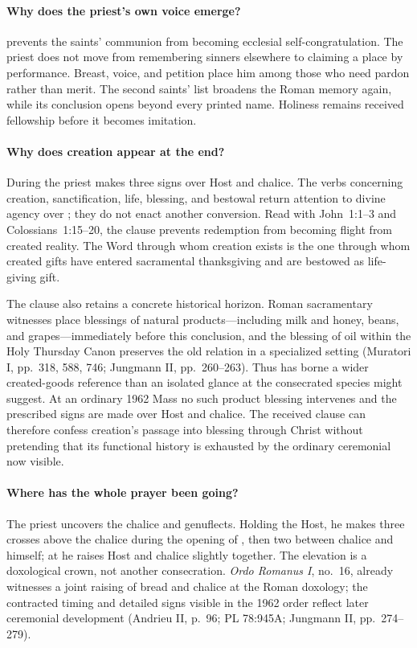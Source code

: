 \paragraph{Why does the priest's own voice emerge?}
 prevents the saints' communion from becoming ecclesial self-congratulation. The priest does not move from remembering sinners elsewhere to claiming a place by performance. Breast, voice, and petition place him among those who need pardon rather than merit. The second saints' list broadens the Roman memory again, while its conclusion opens beyond every printed name. Holiness remains received fellowship before it becomes imitation.

\paragraph{Why does creation appear at the end?}
During  the priest makes three signs over Host and chalice. The verbs concerning creation, sanctification, life, blessing, and bestowal return attention to divine agency over ; they do not enact another conversion. Read with John~1:1--3 and Colossians~1:15--20, the clause prevents redemption from becoming flight from created reality. The Word through whom creation exists is the one through whom created gifts have entered sacramental thanksgiving and are bestowed as life-giving gift.

The clause also retains a concrete historical horizon. Roman sacramentary witnesses place blessings of natural products---including milk and honey, beans, and grapes---immediately before this conclusion, and the blessing of oil within the Holy Thursday Canon preserves the old relation in a specialized setting (Muratori I, pp.~318, 588, 746; Jungmann II, pp.~260--263). Thus  has borne a wider created-goods reference than an isolated glance at the consecrated species might suggest. At an ordinary 1962 Mass no such product blessing intervenes and the prescribed signs are made over Host and chalice. The received clause can therefore confess creation's passage into blessing through Christ without pretending that its functional history is exhausted by the ordinary ceremonial now visible.

\paragraph{Where has the whole prayer been going?}
The priest uncovers the chalice and genuflects. Holding the Host, he makes three crosses above the chalice during the opening of , then two between chalice and himself; at  he raises Host and chalice slightly together. The elevation is a doxological crown, not another consecration. \emph{Ordo Romanus I}, no.~16, already witnesses a joint raising of bread and chalice at the Roman doxology; the contracted timing and detailed signs visible in the 1962 order reflect later ceremonial development (Andrieu II, p.~96; PL 78:945A; Jungmann II, pp.~274--279).

